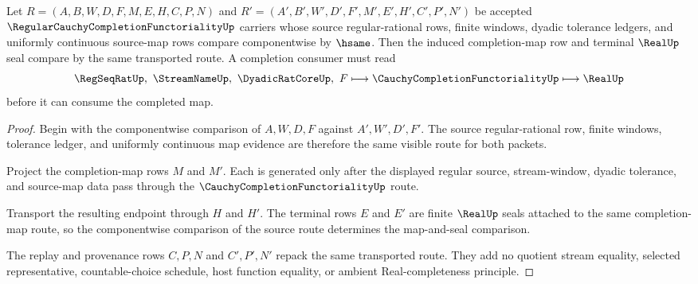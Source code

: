 \begin{theorem}
\label{thm:regular-cauchy-completion-functoriality-map-stability}
Let $R=(A,B,W,D,F,M,E,H,C,P,N)$ and $R'=(A',B',W',D',F',M',E',H',C',P',N')$ be accepted $\RegularCauchyCompletionFunctorialityUp$ carriers whose source regular-rational rows, finite windows, dyadic tolerance ledgers, and uniformly continuous source-map rows compare componentwise by $\hsame$. Then the induced completion-map row and terminal $\RealUp$ seal compare by the same transported route. A completion consumer must read
$$
\RegSeqRatUp,\ \StreamNameUp,\ \DyadicRatCoreUp,\ F
\longmapsto
\CauchyCompletionFunctorialityUp
\longmapsto
\RealUp
$$
before it can consume the completed map.
\end{theorem}
\begin{proof}
Begin with the componentwise comparison of $A,W,D,F$ against $A',W',D',F'$. The source regular-rational row, finite windows, tolerance ledger, and uniformly continuous map evidence are therefore the same visible route for both packets.

Project the completion-map rows $M$ and $M'$. Each is generated only after the displayed regular source, stream-window, dyadic tolerance, and source-map data pass through the $\CauchyCompletionFunctorialityUp$ route.

Transport the resulting endpoint through $H$ and $H'$. The terminal rows $E$ and $E'$ are finite $\RealUp$ seals attached to the same completion-map route, so the componentwise comparison of the source route determines the map-and-seal comparison.

The replay and provenance rows $C,P,N$ and $C',P',N'$ repack the same transported route. They add no quotient stream equality, selected representative, countable-choice schedule, host function equality, or ambient Real-completeness principle.
\end{proof}



